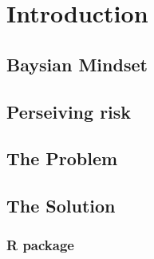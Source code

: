 \chapter{Introduction} \label{sec:Intro}

\section{Baysian Mindset}\label{BayesianMindset}

\section{Perseiving risk}\label{PerseivingRisk}

\section{The Problem}\label{TheProblem}

\section{The Solution}\label{TheSolution}
\subsection{R package}\label{Rpackage}